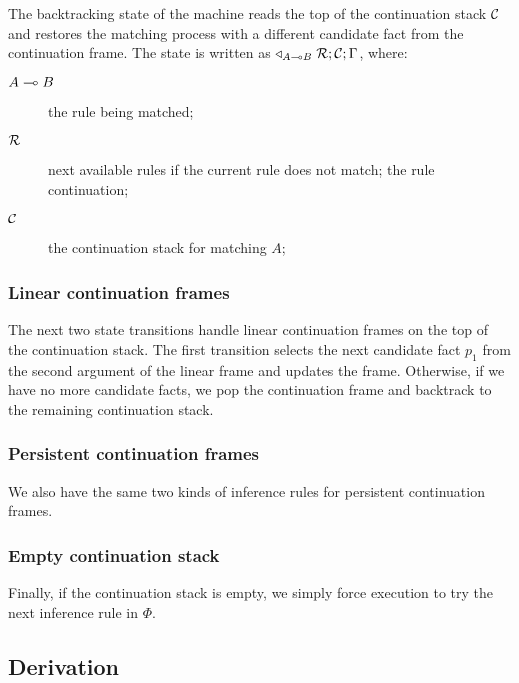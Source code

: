 The backtracking state of the machine reads the top of the continuation stack
$\mathcal{C}$ and restores the matching process with a different candidate fact
from the continuation frame. The state is written as $\triangleleft_{A \multimap
B} \; \mathcal{R}; \mathcal{C}; \Gamma$, where:

\begin{description}
   \item[$A \multimap B$] the rule being matched;
   \item[$\mathcal{R}$] next available rules if the current rule does not match;
   the rule continuation;
   \item[$\mathcal{C}$] the continuation stack for matching $A$;
\end{description}

\subsubsection{Linear continuation frames}

The next two state transitions handle linear continuation frames on the top of the
continuation stack. The first transition selects the next candidate fact $p_1$ from the
second argument of the linear frame and updates the frame. Otherwise, if we have
no more candidate facts, we pop the continuation frame and backtrack to the
remaining continuation stack.



\subsubsection{Persistent continuation frames}

We also have the same two kinds of inference rules for persistent continuation
frames.



\subsubsection{Empty continuation stack}

Finally, if the continuation stack is empty, we simply force execution to try
the next inference rule in $\Phi$.



\subsection{Derivation}

